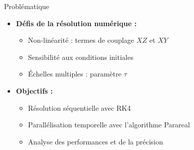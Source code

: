\begin{frame}{Problématique}
    \begin{itemize}
        \item \textbf{Défis de la résolution numérique :}
        \begin{itemize}
            \item Non-linéarité : termes de couplage $XZ$ et $XY$
            \item Sensibilité aux conditions initiales
            \item Échelles multiples : paramètre $\tau$
        \end{itemize}
        \vspace{0.5cm}
        \item \textbf{Objectifs :}
        \begin{itemize}
            \item Résolution séquentielle avec RK4
            \item Parallélisation temporelle avec l'algorithme Parareal
            \item Analyse des performances et de la précision
        \end{itemize}
    \end{itemize}
\end{frame}